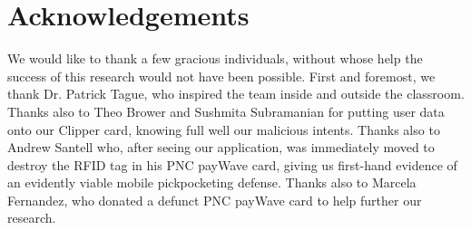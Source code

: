\documentclass{IEEEtran}
\begin{document}
\section*{Acknowledgements}
We would like to thank a few gracious individuals, without whose help the success of this research would not have been possible.  First and foremost, we thank Dr. Patrick Tague, who inspired the team inside and outside the classroom.  Thanks also to Theo Brower and Sushmita Subramanian for putting user data onto our Clipper card, knowing full well our malicious intents.  Thanks also to Andrew Santell who, after seeing our application, was immediately moved to destroy the RFID tag in his PNC payWave card, giving us first-hand evidence of an evidently viable mobile pickpocketing defense.  Thanks also to Marcela Fernandez, who donated a defunct PNC payWave card to help further our research.

%
%



\nocite{*}
\end{document}
